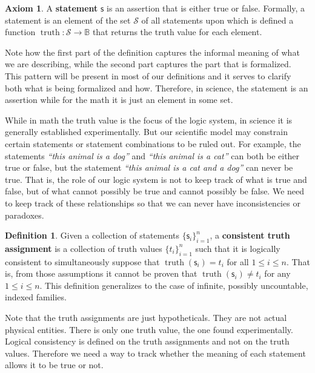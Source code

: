 \documentclass[letterpaper]{article}
\theoremstyle{plain}%
\theoremstyle{definition}
\newtheorem{defn}[thrm]{Definition}
\newtheorem{axiom}[thrm]{Axiom}
\theoremstyle{remark}
\numberwithin{equation}{section}
\DeclareMathOperator{\truth}{truth}
\newcommand{\stmt}[1][s] {\mathsf{#1}}
\newcommand{\statement}[1] {\emph{``#1''}}
\begin{document}
\begin{axiom}\label{ax_statement}
	A \textbf{statement} $\stmt$ is an assertion that is either true or false. Formally, a statement is an element of the set $\mathcal{S}$ of all statements upon which is defined a function $\truth: \mathcal{S} \to \mathbb{B}$ that returns the truth value for each element.
\end{axiom}

Note how the first part of the definition captures the informal meaning of what we are describing, while the second part captures the part that is formalized. This pattern will be present in most of our definitions and it serves to clarify both what is being formalized and how. Therefore, in science, the statement is an assertion while for the math it is just an element in some set.

While in math the truth value is the focus of the logic system, in science it is generally established experimentally. But our scientific model may constrain certain statements or statement combinations to be ruled out. For example, the statements \statement{this animal is a dog} and \statement{this animal is a cat} can both be either true or false, but the statement \statement{this animal is a cat and a dog} can never be true. That is, the role of our logic system is not to keep track of what is true and false, but of what cannot possibly be true and cannot possibly be false. We need to keep track of these relationships so that we can never have inconsistencies or paradoxes.

\begin{defn}
	Given a collection of statements $\{\stmt_i\}^n_{i=1}$, a \textbf{consistent truth assignment} is a collection of truth values $\{t_i\}^n_{i=1}$ such that it is logically consistent to simultaneously suppose that $\truth(\stmt_i) = t_i$ for all $1 \leq i \leq n$. That is, from those assumptions it cannot be proven that $\truth(\stmt_i) \neq t_i$ for any $1 \leq i \leq n$.  This definition generalizes to the case of infinite, possibly uncountable, indexed families.
\end{defn}

Note that the truth assignments are just hypotheticals. They are not actual physical entities. There is only one truth value, the one found experimentally. Logical consistency is defined on the truth assignments and not on the truth values. Therefore we need a way to track whether the meaning of each statement allows it to be true or not.
\end{document}

